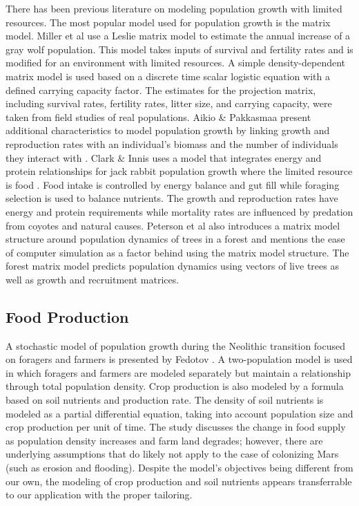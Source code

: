 \documentclass[12pt]{article}
\begin{document}
There has been previous literature on modeling population growth with limited
resources. The most popular model used for population growth is the matrix
model.  Miller et al \cite{miller2002density} use a Leslie matrix
model to estimate the annual increase of a gray wolf population. This model
takes inputs of survival and fertility rates and is modified for an environment
with limited resources. A simple density-dependent matrix model is used based
on a discrete time scalar logistic equation with a defined carrying capacity
factor. The estimates for the projection matrix, including survival rates,
fertility rates, litter size, and carrying capacity, were taken from field
studies of real populations. Aikio \& Pakkasmaa present additional
characteristics to model population growth by linking growth and reproduction
rates with an individual's biomass and the number of individuals they
interact with \cite{aikio2003relatedness}. Clark \& Innis uses a model that
integrates energy and protein relationships for jack rabbit population growth
where the limited resource is food \cite{clark1982forage}. Food intake is
controlled by energy balance and gut fill while foraging selection is used to
balance nutrients. The growth and reproduction rates have energy and protein
requirements while mortality rates are influenced by predation from coyotes and
natural causes.  Peterson et al \cite{peterson2014modeling} also introduces a
matrix model structure around population dynamics of trees in a forest and
mentions the ease of computer simulation as a factor behind using the matrix
model structure. The forest matrix model predicts population dynamics using
vectors of live trees as well as growth and recruitment matrices.

\subsection{Food Production}

A stochastic model of population growth	during the Neolithic transition focused
on foragers and farmers is presented by Fedotov \cite{fedotov2008stochastic}. A
two-population model is used in which foragers and farmers are modeled
separately but maintain a relationship through total population density.
Crop production is also modeled by a formula based on soil nutrients and
production rate. The density of soil nutrients is modeled as a partial
differential equation, taking into account population size and crop production
per unit of time. The study discusses the change in food supply as population
density increases and farm land degrades; however, there are underlying
assumptions that do likely not apply to the case of colonizing Mars (such as
erosion and flooding). Despite the model's objectives being different from our
own, the modeling of crop production and soil nutrients appears transferrable
to our application with the proper tailoring.
\end{document}
